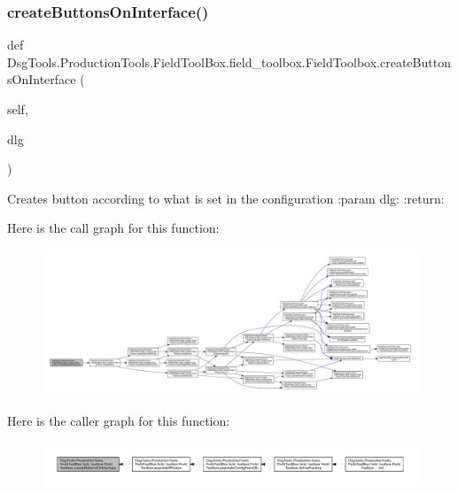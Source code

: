 \subsubsection{\texorpdfstring{create\+Buttons\+On\+Interface()}{createButtonsOnInterface()}}
{\footnotesize\ttfamily def Dsg\+Tools.\+Production\+Tools.\+Field\+Tool\+Box.\+field\+\_\+toolbox.\+Field\+Toolbox.\+create\+Buttons\+On\+Interface (\begin{DoxyParamCaption}\item[{}]{self,  }\item[{}]{dlg }\end{DoxyParamCaption})}

\begin{DoxyVerb}Creates button according to what is set in the configuration
:param dlg:
:return:
\end{DoxyVerb}
 Here is the call graph for this function\+:
\nopagebreak
\begin{figure}[H]
\begin{center}
\leavevmode
\includegraphics[width=350pt]{class_dsg_tools_1_1_production_tools_1_1_field_tool_box_1_1field__toolbox_1_1_field_toolbox_a1d76a17d90eacca8d0ad9eb0582fc43d_cgraph}
\end{center}
\end{figure}
Here is the caller graph for this function\+:
\nopagebreak
\begin{figure}[H]
\begin{center}
\leavevmode
\includegraphics[width=350pt]{class_dsg_tools_1_1_production_tools_1_1_field_tool_box_1_1field__toolbox_1_1_field_toolbox_a1d76a17d90eacca8d0ad9eb0582fc43d_icgraph}
\end{center}
\end{figure}
\mbox{\label{class_dsg_tools_1_1_production_tools_1_1_field_tool_box_1_1field__toolbox_1_1_field_toolbox_a5feea2b516215abe47448667836e1211}} 

